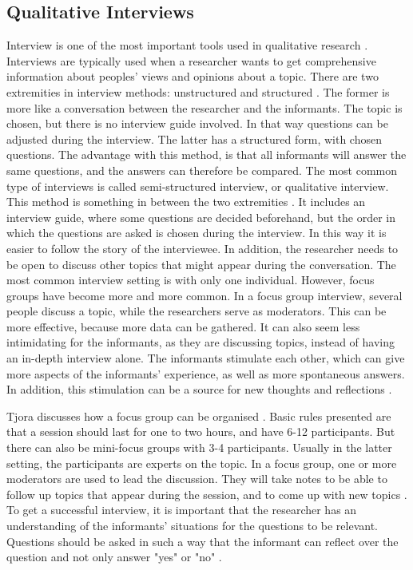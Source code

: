 \subsection{Qualitative Interviews}
\label{sec:qualitativeInterviews}
Interview is one of the most important tools used in qualitative research \cite{interview}. Interviews are typically used when a researcher wants to get comprehensive information about peoples' views and opinions about a topic. There are two extremities in interview methods: unstructured and structured \cite{qualitative}. The former is more like a conversation between the researcher and the informants. The topic is chosen, but there is no interview guide involved. In that way questions can be adjusted during the interview. The latter has a structured form, with chosen questions. The advantage with this method, is that all informants will answer the same questions, and the answers can therefore be compared. The most common type of interviews is called semi-structured interview, or qualitative interview. This method is something in between the two extremities \cite{qualitative}. It includes an interview guide, where some questions are decided beforehand, but the order in which the questions are asked is chosen during the interview. In this way it is easier to follow the story of the interviewee. In addition, the researcher needs to be open to discuss other topics that might appear during the conversation. The most common interview setting is with only one individual. However, focus groups have become more and more common. In a focus group interview, several people discuss a topic, while the researchers serve as moderators. This can be more effective, because more data can be gathered. It can also seem less intimidating for the informants, as they are discussing topics, instead of having an in-depth interview alone. The informants stimulate each other, which can give more aspects of the informants' experience, as well as more spontaneous answers. In addition, this stimulation can be a source for new thoughts and reflections \cite{tjora}. 

Tjora discusses how a focus group can be organised \cite{tjora}. Basic rules presented are that a session should last for one to two hours, and have 6-12 participants. But there can also be mini-focus groups with 3-4 participants. Usually in the latter setting, the participants are experts on the topic. In a focus group, one or more moderators are used to lead the discussion. They will take notes to be able to follow up topics that appear during the session, and to come up with new topics \cite{tjora}. To get a successful interview, it is important that the researcher has an understanding of the informants' situations for the questions to be relevant. Questions should be asked in such a way that the informant can reflect over the question and not only answer "yes" or "no" \cite{qualitative}.

